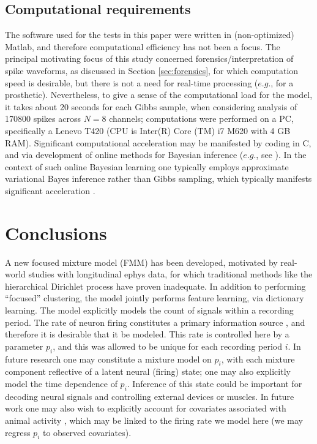 \documentclass[journal]{IEEEtran}
\begin{document}
\subsection{Computational requirements}

The software used for the tests in this paper were written in (non-optimized) Matlab, and therefore computational efficiency has not been a focus. The principal motivating focus of this study concerned forensics/interpretation of spike waveforms, as discussed in Section \ref{sec:forensics}, for which computation speed is desirable, but there is not a need for real-time processing ($e.g.$, for a prosthetic).
 Nevertheless, to give a sense of the computational load for the model, it takes about 20 seconds for each Gibbs sample, when considering analysis of 170800 spikes across $N=8$ channels; computations were performed on a PC, specifically a Lenevo T420 (CPU is Inter(R) Core (TM) i7 M620 with 4 GB RAM). Significant computational acceleration may be manifested by coding in C, and via development of online methods for Bayesian inference ($e.g.$, see \cite{Wang11}). In the context of such online Bayesian learning one typically employs approximate variational Bayes inference rather than Gibbs sampling, which typically manifests significant acceleration \cite{Wang11}.

\section{Conclusions\label{sec:conclusions}}

A new focused mixture model (FMM) has been developed, motivated by real-world studies with longitudinal ephys data, for which traditional methods like the hierarchical Dirichlet process have proven inadequate. In addition to performing ``focused'' clustering, the model jointly performs feature learning, via dictionary learning. The model explicitly models the count of signals within a recording period. The rate of neuron firing constitutes a primary information source \cite{Donoghue07}, and therefore it is desirable that it be modeled. This rate is controlled here by a parameter $p_i$, and this was allowed to be unique for each recording period $i$. In future research one may constitute a mixture model on $p_i$, with each mixture component reflective of a latent neural (firing) state; one may also explicitly model the time dependence of $p_i$. Inference of this state could be important for decoding neural signals and controlling external devices or muscles. In future work one may also wish to explicitly account for covariates associated with animal activity \cite{Ventura}, which may be linked to the firing rate we model here (we may regress $p_i$ to observed covariates). 
\end{document}
